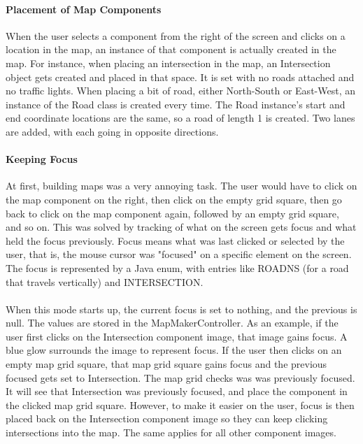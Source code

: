 \documentclass[a4paper,11pt,titlepage]{article}
\begin{document}
\paragraph{Placement of Map Components}
When the user selects a component from the right of the screen and clicks on a location in the map, an instance of that component is actually created in the map. For instance, when placing an intersection in the map, an Intersection object gets created and placed in that space. It is set with no roads attached and no traffic lights. When placing a bit of road, either North-South or East-West, an instance of the Road class is created every time. The Road instance's start and end coordinate locations are the same, so a road of length 1 is created. Two lanes are added, with each going in opposite directions.
\paragraph{Keeping Focus}
At first, building maps was a very annoying task. The user would have to click on the map component on the right, then click on the empty grid square, then go back to click on the map component again, followed by an empty grid square, and so on. This was solved by tracking of what on the screen gets focus and what held the focus previously. Focus means what was last clicked or selected  by the user, that is, the mouse cursor was "focused" on a specific element on the screen. The focus is represented by a Java enum, with entries like ROADNS (for a road that travels vertically) and INTERSECTION. 
\paragraph{}
When this mode starts up, the current focus is set to nothing, and the previous is null. The values are stored in the MapMakerController. As an example, if the user first clicks on the Intersection component image, that image gains focus. A blue glow surrounds the image to represent focus. If the user then clicks on an empty map grid square, that map grid square gains focus and the previous focused gets set to Intersection. The map grid checks was was previously focused. It will see that Intersection was previously focused, and place the component in the clicked map grid square. However, to make it easier on the user, focus is then placed back on the Intersection component image so they can keep clicking intersections into the map. The same applies for all other component images. 
\end{document}

